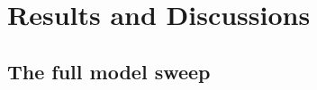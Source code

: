 \documentclass[conference,a4paper]{IEEEtran}
\begin{document}
\section{Results and Discussions}
\label{sec:results}

\subsection{The full model sweep}
\label{sec:sweep}
\end{document}
